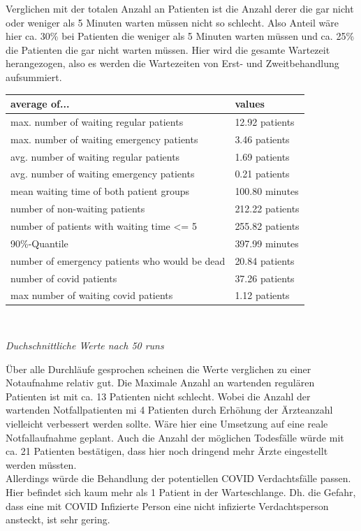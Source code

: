 \documentclass{article}
\begin{document}
Verglichen mit der totalen Anzahl an Patienten ist die Anzahl derer die gar nicht oder weniger als 5 Minuten warten müssen nicht so schlecht. Also Anteil wäre hier ca. 30\% bei Patienten die weniger als 5 Minuten warten müssen und ca. 25\% die Patienten die gar nicht warten müssen. Hier wird die gesamte Wartezeit herangezogen, also es werden die Wartezeiten von Erst- und Zweitbehandlung aufsummiert. \\


\vspace{\baselineskip}
\begin{tabular}{|l|l|}
\hline
\textbf{average of...} & \textbf{values}\\ \hline
max. number of waiting regular patients & 12.92 patients  \\ \hline
max. number of waiting emergency patients & 3.46 patients  \\ \hline
avg. number of waiting regular patients & 1.69 patients  \\ \hline
avg. number of waiting emergency patients & 0.21 patients  \\ \hline
mean waiting time of both patient groups & 100.80 minutes  \\ \hline
number of non-waiting patients & 212.22 patients  \\ \hline
number of patients with waiting time <= 5 & 255.82 patients  \\ \hline
90\%-Quantile & 397.99 minutes  \\ \hline
number of emergency patients who would be dead & 20.84 patients  \\ \hline
number of covid patients & 37.26 patients  \\ \hline
max number of waiting covid patients & 1.12 patients  \\ \hline
\end{tabular}\\
\begin{center}
\textit{Duchschnittliche Werte nach 50 runs}\\
\end{center}
\vspace{\baselineskip}

Über alle Durchläufe gesprochen scheinen die Werte verglichen zu einer Notaufnahme relativ gut. Die Maximale Anzahl an wartenden regulären Patienten ist mit ca. 13 Patienten nicht schlecht. Wobei die Anzahl der wartenden Notfallpatienten mi 4 Patienten durch Erhöhung der Ärzteanzahl vielleicht verbessert werden sollte. Wäre hier eine Umsetzung auf eine reale Notfallaufnahme geplant. Auch die Anzahl der möglichen Todesfälle würde mit ca. 21 Patienten bestätigen, dass hier noch dringend mehr Ärzte eingestellt werden müssten. \\
Allerdings würde die Behandlung der potentiellen COVID Verdachtsfälle passen. Hier befindet sich kaum mehr als 1 Patient in der Warteschlange. Dh. die Gefahr, dass eine mit COVID Infizierte Person eine nicht infizierte Verdachtsperson ansteckt, ist sehr gering.
\end{document}
